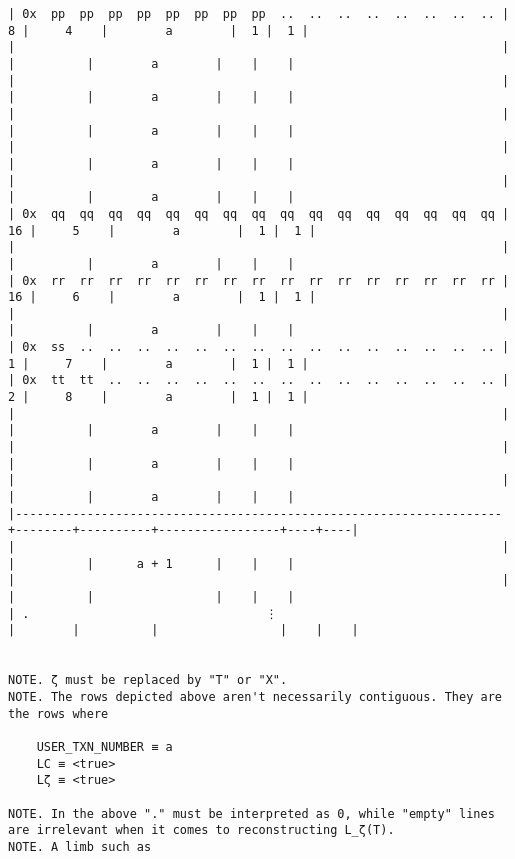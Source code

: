 \documentclass[varwidth=\maxdimen,margin=0.5cm,multi={verbatim}]{standalone}
\begin{document}
\begin{verbatim}
| 0x  pp  pp  pp  pp  pp  pp  pp  pp  ..  ..  ..  ..  ..  ..  ..  .. |      8 |     4    |        a        |  1 |  1 |
|                                                                    |        |          |        a        |    |    |
|                                                                    |        |          |        a        |    |    |
|                                                                    |        |          |        a        |    |    |
|                                                                    |        |          |        a        |    |    |
|                                                                    |        |          |        a        |    |    |
| 0x  qq  qq  qq  qq  qq  qq  qq  qq  qq  qq  qq  qq  qq  qq  qq  qq |     16 |     5    |        a        |  1 |  1 |
|                                                                    |        |          |        a        |    |    |
| 0x  rr  rr  rr  rr  rr  rr  rr  rr  rr  rr  rr  rr  rr  rr  rr  rr |     16 |     6    |        a        |  1 |  1 |
|                                                                    |        |          |        a        |    |    |
| 0x  ss  ..  ..  ..  ..  ..  ..  ..  ..  ..  ..  ..  ..  ..  ..  .. |      1 |     7    |        a        |  1 |  1 |
| 0x  tt  tt  ..  ..  ..  ..  ..  ..  ..  ..  ..  ..  ..  ..  ..  .. |      2 |     8    |        a        |  1 |  1 |
|                                                                    |        |          |        a        |    |    |
|                                                                    |        |          |        a        |    |    |
|                                                                    |        |          |        a        |    |    |
|--------------------------------------------------------------------+--------+----------+-----------------+----+----|
|                                                                    |        |          |      a + 1      |    |    |
|                                                                    |        |          |                 |    |    |
| .                                 ⋮                                |        |          |                 |    |    |


NOTE. ζ must be replaced by "T" or "X".
NOTE. The rows depicted above aren't necessarily contiguous. They are the rows where

    USER_TXN_NUMBER ≡ a
    LC ≡ <true>
    Lζ ≡ <true>

NOTE. In the above "." must be interpreted as 0, while "empty" lines are irrelevant when it comes to reconstructing L_ζ(T).
NOTE. A limb such as


\end{verbatim}
\end{document}
